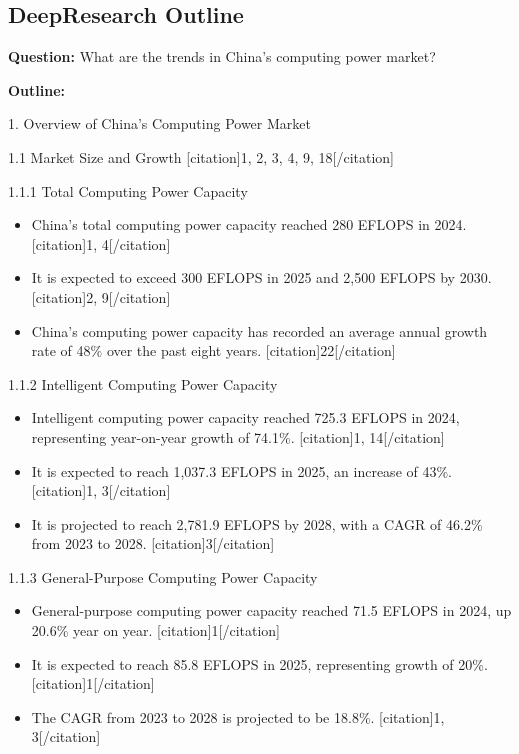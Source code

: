 \documentclass{huawei}
\begin{document}
\subsection{DeepResearch Outline}
\label{appendix:DeepResearch Outline}
\begin{tcolorbox}[
    title={Example of Hierarchical Research Outline},
    colback=gray!5,
    colframe=gray!40,
    fonttitle=\bfseries,
    boxrule=0.5pt,
    arc=2pt,
    breakable
]
\ttfamily
\textbf{Question:} What are the trends in China’s computing power market?

\textbf{Outline:} 

\textcolor{TitleRed}{1. Overview of China’s Computing Power Market}

\textcolor{TitleRed}{1.1 Market Size and Growth [citation]1, 2, 3, 4, 9, 18[/citation]}

\textcolor{TitleRed}{1.1.1 Total Computing Power Capacity}
\begin{itemize}[leftmargin=1em, listparindent=\parindent]
\item China’s total computing power capacity reached 280 EFLOPS in 2024. [citation]1, 4[/citation]
\item It is expected to exceed 300 EFLOPS in 2025 and 2,500 EFLOPS by 2030. [citation]2, 9[/citation]
\item China’s computing power capacity has recorded an average annual growth rate of 48\% over the past eight years. [citation]22[/citation]
\end{itemize}


\textcolor{TitleRed}{1.1.2 Intelligent Computing Power Capacity}
\begin{itemize}[leftmargin=1em, listparindent=\parindent]
\item Intelligent computing power capacity reached 725.3 EFLOPS in 2024, representing year-on-year growth of 74.1\%. [citation]1, 14[/citation]
\item It is expected to reach 1,037.3 EFLOPS in 2025, an increase of 43\%. [citation]1, 3[/citation]
\item It is projected to reach 2,781.9 EFLOPS by 2028, with a CAGR of 46.2\% from 2023 to 2028. [citation]3[/citation]
\end{itemize}

\textcolor{TitleRed}{1.1.3 General-Purpose Computing Power Capacity}
\begin{itemize}[leftmargin=1em, listparindent=\parindent]
\item General-purpose computing power capacity reached 71.5 EFLOPS in 2024, up 20.6\% year on year. [citation]1[/citation]
\item It is expected to reach 85.8 EFLOPS in 2025, representing growth of 20\%. [citation]1[/citation]
\item The CAGR from 2023 to 2028 is projected to be 18.8\%. [citation]1, 3[/citation]
\end{itemize}


\end{tcolorbox}
\end{document}

